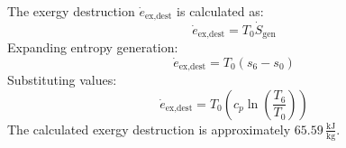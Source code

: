 The exergy destruction \( \dot{e}_{\text{ex,dest}} \) is calculated as:  
\[
\dot{e}_{\text{ex,dest}} = T_0 \dot{S}_{\text{gen}}
\]  
Expanding entropy generation:  
\[
\dot{e}_{\text{ex,dest}} = T_0 (s_6 - s_0)
\]  
Substituting values:  
\[
\dot{e}_{\text{ex,dest}} = T_0 \left(c_p \ln\left(\frac{T_6}{T_0}\right)\right)
\]  
The calculated exergy destruction is approximately \( 65.59 \, \frac{\text{kJ}}{\text{kg}} \).
